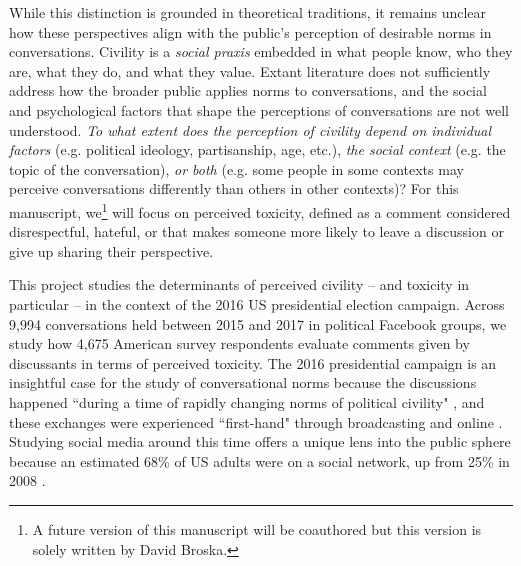 \documentclass{article}
\begin{document}
While this distinction is grounded in theoretical traditions, it remains unclear how these perspectives align with the public's perception of desirable norms in conversations. Civility is a \textit{social praxis} embedded in what people know, who they are, what they do, and what they value. Extant literature does not sufficiently address how the broader public applies norms to conversations, and the social and psychological factors that shape the perceptions of conversations are not well understood. \textit{To what extent does the perception of civility depend on individual factors} (e.g. political ideology, partisanship, age, etc.), \textit{the social context} (e.g. the topic of the conversation), \textit{or both} (e.g. some people in some contexts may perceive conversations differently than others in other contexts)? For this manuscript, we\footnote{A future version of this manuscript will be coauthored but this version is solely written by David Broska.} will focus on perceived toxicity, defined as a comment considered disrespectful, hateful, or that makes someone more likely to leave a discussion or give up sharing their perspective. 

This project studies the determinants of perceived civility -- and toxicity in particular -- in the context of the 2016 US presidential election campaign. Across 9,994 conversations held between 2015 and 2017 in political Facebook groups, we study how 4,675 American survey respondents evaluate comments given by discussants in terms of perceived toxicity. The 2016 presidential campaign is an insightful case for the study of conversational norms because the discussions happened ``during a time of rapidly changing norms of political civility" \citep{munger_dont_2021}, and these exchanges were experienced ``first-hand" through broadcasting and online \citep{mutz_inyourface_2016}. Studying social media around this time offers a unique lens into the public sphere because an estimated 68\% of US adults were on a social network, up from 25\% in 2008 \citep{duggan_social_2016}.

\end{document}
